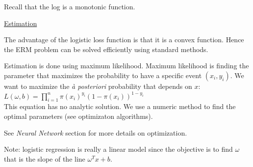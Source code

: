 Recall that the log is a monotonic function.

\vspace{5mm}

\underline{Estimation}

The advantage of the logistic loss function is that it is a convex function. Hence the ERM problem can be solved efficiently using standard methods.

Estimation is done using maximum likelihood. Maximum likelihood is finding the parameter that maximizes the probability to have a specific event $(x_i, y_i)$. We want to maximize the \textit{à posteriori} probability that depends on $x$: \\

$L(\omega, b) = \prod_{i=1}^n \pi(x_i)^{y_i}(1-\pi(x_i))^{1-y_i}$ \\

This equation has no analytic solution. We use a numeric method to find the optimal parameters (see optimizaton algorithms).

See \textit{Neural Network} section for more details on optimization.

\vspace{5mm}

Note: logistic regression is really a linear model since the objective is to find $\omega$ that is the slope of the line $\omega ^Tx + b$.

\vspace{5mm}